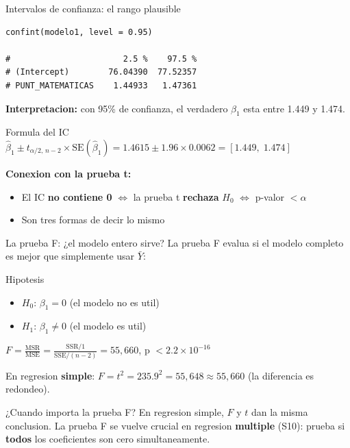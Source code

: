 \documentclass[aspectratio=169, 11pt]{beamer}
\begin{document}
\begin{frame}[fragile]{Intervalos de confianza: el rango plausible}
\small
\begin{lstlisting}[basicstyle=\ttfamily\scriptsize]
confint(modelo1, level = 0.95)

#                       2.5 %    97.5 %
# (Intercept)        76.04390  77.52357
# PUNT_MATEMATICAS    1.44933   1.47361
\end{lstlisting}

\vspace{0.2cm}
\textbf{Interpretacion:} con 95\% de confianza, el verdadero $\beta_1$ esta entre 1.449 y 1.474.

\vspace{0.1cm}
\begin{block}{Formula del IC}
$\hat{\beta}_1 \pm t_{\alpha/2,\, n-2} \times \text{SE}(\hat{\beta}_1) = 1.4615 \pm 1.96 \times 0.0062 = [1.449,\; 1.474]$
\end{block}

\vspace{0.1cm}
\textbf{Conexion con la prueba t:}
\begin{itemize}
  \item El IC \textbf{no contiene 0} $\Leftrightarrow$ la prueba t \textbf{rechaza} $H_0$ $\Leftrightarrow$ p-valor $< \alpha$
  \item Son tres formas de decir lo mismo
\end{itemize}
\end{frame}

\begin{frame}{La prueba F: ¿el modelo entero sirve?}
\small
La prueba F evalua si el modelo completo es mejor que simplemente usar $\bar{Y}$:

\begin{block}{Hipotesis}
\begin{itemize}
  \item $H_0$: $\beta_1 = 0$ (el modelo no es util)
  \item $H_1$: $\beta_1 \neq 0$ (el modelo es util)
\end{itemize}
\end{block}

$F = \frac{\text{MSR}}{\text{MSE}} = \frac{\text{SSR}/1}{\text{SSE}/(n-2)} = 55{,}660$, \quad p $< 2.2 \times 10^{-16}$

\vspace{0.2cm}
En regresion \textbf{simple}: $F = t^2 = 235.9^2 = 55{,}648 \approx 55{,}660$ (la diferencia es redondeo).

\vspace{0.2cm}
\begin{alertblock}{¿Cuando importa la prueba F?}
\small En regresion simple, $F$ y $t$ dan la misma conclusion. La prueba F se vuelve crucial en regresion \textbf{multiple} (S10): prueba si \textbf{todos} los coeficientes son cero simultaneamente.
\end{alertblock}
\end{frame}
\end{document}
